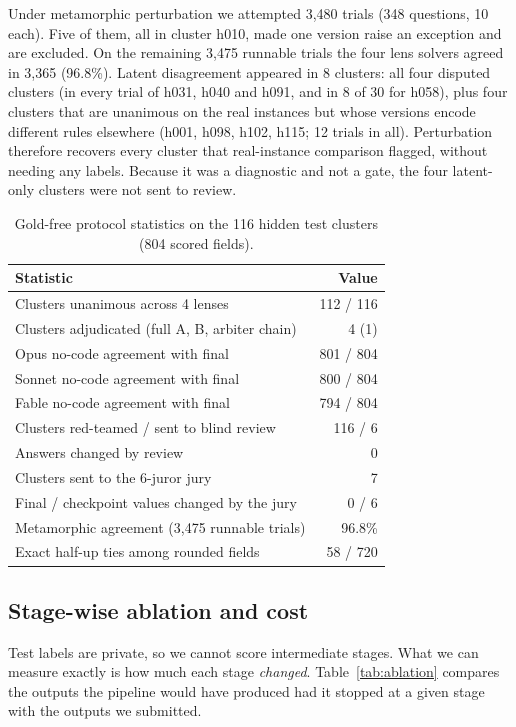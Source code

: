 \documentclass[conference]{IEEEtran}
\begin{document}
Under metamorphic perturbation we attempted 3{,}480 trials (348 questions, 10 each). Five of them, all in cluster
h010, made one version raise an exception and are excluded. On the remaining 3{,}475 runnable trials the four lens
solvers agreed in 3{,}365 (96.8\%). Latent disagreement appeared in 8 clusters: all four disputed clusters (in every
trial of h031, h040 and h091, and in 8 of 30 for h058), plus four clusters that are unanimous
on the real instances but whose versions encode different rules elsewhere (h001, h098, h102, h115; 12 trials in all).
Perturbation therefore recovers every
cluster that real-instance comparison flagged, without needing any labels. Because it was a diagnostic and not a
gate, the four latent-only clusters were not sent to review.

\begin{table}[t]
\centering
\caption{Gold-free protocol statistics on the 116 hidden test clusters (804 scored fields).}
\label{tab:hidden}
\begin{tabular}{lr}
\toprule
Statistic & Value \\
\midrule
Clusters unanimous across 4 lenses & 112 / 116 \\
Clusters adjudicated (full A, B, arbiter chain) & 4 (1) \\
Opus no-code agreement with final & 801 / 804 \\
Sonnet no-code agreement with final & 800 / 804 \\
Fable no-code agreement with final & 794 / 804 \\
Clusters red-teamed / sent to blind review & 116 / 6 \\
Answers changed by review & 0 \\
Clusters sent to the 6-juror jury & 7 \\
Final / checkpoint values changed by the jury & 0 / 6 \\
Metamorphic agreement (3{,}475 runnable trials) & 96.8\% \\
Exact half-up ties among rounded fields & 58 / 720 \\
\bottomrule
\end{tabular}
\end{table}

\subsection{Stage-wise ablation and cost}\label{sec:ablation}
Test labels are private, so we cannot score intermediate stages. What we can measure exactly is how much each stage
\emph{changed}. Table~\ref{tab:ablation} compares the outputs the pipeline would have produced had it stopped at a
given stage with the outputs we submitted.
\end{document}

